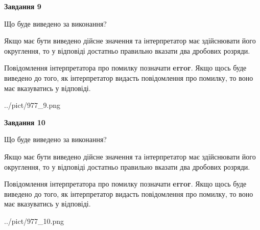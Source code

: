 \documentclass[12pt, ukrainian]{article}
\begin{document}
{\begin {Large}
{\begin {center}\textbf{Завдання 9}\end {center}}\par
Що буде виведено за виконання? \par

Якщо має бути виведено дійсне значення та інтерпретатор має здійснювати його округлення, 
то у відповіді достатньо правильно вказати два дробових розряди.

Повідомлення інтерпретатора про помилку позначати \textbf{error}.
Якщо щось буде виведено до того, як інтерпретатор видасть повідомлення про помилку, 
то воно має вказуватись у відповіді. \par

\begin{center}
	{../pict/977_9.png}
\end{center}
\newpage

{\begin {center}\textbf{Завдання 10}\end {center}}\par
Що буде виведено за виконання? \par

Якщо має бути виведено дійсне значення та інтерпретатор має здійснювати його округлення, 
то у відповіді достатньо правильно вказати два дробових розряди.

Повідомлення інтерпретатора про помилку позначати \textbf{error}.
Якщо щось буде виведено до того, як інтерпретатор видасть повідомлення про помилку, 
то воно має вказуватись у відповіді. \par

\begin{center}
	{../pict/977_10.png}
\end{center}
\newpage

\end {Large}}
\end{document}
